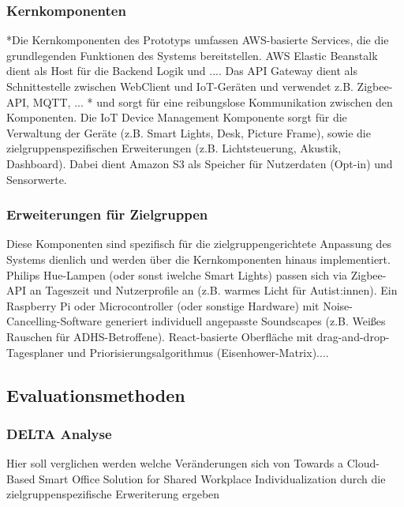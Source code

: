 
\subsubsection{Kernkomponenten}
*Die Kernkomponenten des Prototyps umfassen AWS-basierte Services, die die grundlegenden Funktionen des Systems bereitstellen.
AWS Elastic Beanstalk dient als Host für die Backend Logik und ....  Das API Gateway dient als Schnittestelle zwischen WebClient 
und IoT-Geräten und verwendet  z.B. Zigbee-API, MQTT, ... * und sorgt für eine reibungslose Kommunikation zwischen den Komponenten.
Die IoT Device Management Komponente sorgt für die Verwaltung der Geräte (z.B. Smart Lights, Desk, Picture Frame), sowie die 
zielgruppenspezifischen Erweiterungen (z.B. Lichtsteuerung, Akustik, Dashboard). Dabei dient Amazon S3 als Speicher für Nutzerdaten
(Opt-in) und Sensorwerte.


\subsubsection{Erweiterungen für Zielgruppen}
Diese Komponenten sind spezifisch für die zielgruppengerichtete Anpassung des Systems dienlich und werden über die 
Kernkomponenten hinaus implementiert. Philips Hue-Lampen (oder sonst iwelche Smart Lights) passen sich via Zigbee-API
an Tageszeit und Nutzerprofile an (z.B. warmes Licht für Autist:innen). Ein Raspberry Pi oder Microcontroller (oder sonstige Hardware)
mit Noise-Cancelling-Software generiert individuell angepasste Soundscapes (z.B. Weißes Rauschen für ADHS-Betroffene).
React-basierte Oberfläche mit drag-and-drop-Tagesplaner und Priorisierungsalgorithmus (Eisenhower-Matrix)....


\subsection{Evaluationsmethoden}

\subsubsection{DELTA Analyse}
Hier soll verglichen werden welche Veränderungen sich von \cite{ref01}{Towards a Cloud-Based Smart Office 
Solution for Shared Workplace Individualization} durch die zielgruppenspezifische Erweriterung ergeben


